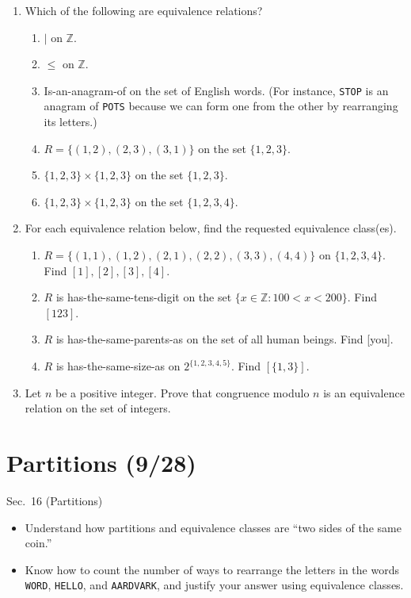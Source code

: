 \documentclass[11pt]{article}
\newcommand{\set}[1]{\{ #1 \}}
\begin{document}
\begin{enumerate}
\item Which of the following are equivalence relations?
\begin{enumerate}
\item $\mid$ on $\mathbb{Z}$.
\item $\leq$ on $\mathbb{Z}$.
\item Is-an-anagram-of on the set of English words. (For instance, \texttt{STOP} is an anagram of \texttt{POTS} because we can form one from the other by rearranging its letters.)
\item $R=\set{(1,2),(2,3),(3,1)}$ on the set $\set{1,2,3}$.
\item $\set{1,2,3} \times \set{1,2,3}$ on the set $\set{1,2,3}$.
\item $\set{1,2,3} \times \set{1,2,3}$ on the set $\set{1,2,3,4}$.
\end{enumerate}
\item For each equivalence relation below, find the requested equivalence class(es).
\begin{enumerate}
\item $R=\set{(1,1), (1,2), (2,1), (2,2), (3,3), (4,4)}$ on $\set{1,2,3,4}$. Find $[1],[2],[3],[4]$.
\item $R$ is has-the-same-tens-digit on the set $\set{x \in \mathbb{Z} : 100 < x < 200}$. Find $[123]$.
\item $R$ is has-the-same-parents-as on the set of all human beings. Find [you].
\item $R$ is has-the-same-size-as on $2^{\set{1,2,3,4,5}}$. Find $[\set{1,3}]$.
\end{enumerate}
\item Let $n$ be a positive integer. Prove that congruence modulo $n$ is an equivalence relation on the set of integers.
\end{enumerate}

\section*{Partitions (9/28)}
\begin{textbook}{Sec.~16 (Partitions)}
\begin{itemize}[leftmargin=*, nosep]
\item Understand how partitions and equivalence classes are ``two sides of the same coin.''
\item Know how to count the number of ways to rearrange the letters in the words \texttt{WORD}, \texttt{HELLO}, and \texttt{AARDVARK}, and justify your answer using equivalence classes.
\end{itemize}
\end{textbook}
\end{document}
